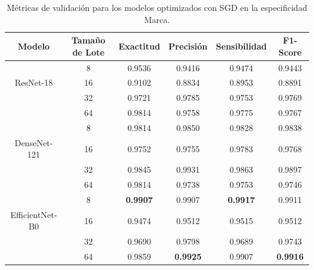 \begin{table}[H]
	\begin{adjustbox}
		{width=1\textwidth}
		\begin{tabular}{|c|c|c|c|c|c|}
			\hline
			\textbf{Modelo}             & \textbf{Tamaño de Lote} & \textbf{Exactitud} & \textbf{Precisión} & \textbf{Sensibilidad} & \textbf{F1-Score} \\
			\hline
			& 8                       & 0.9536             & 0.9416             & 0.9474                & 0.9443            \\
			\cline{2-6} ResNet-18       & 16                      & 0.9102             & 0.8834             & 0.8953                & 0.8891            \\
			\cline{2-6}                 & 32                      & 0.9721             & 0.9785             & 0.9753                & 0.9769            \\
			\cline{2-6}                 & 64                      & 0.9814             & 0.9758             & 0.9775                & 0.9767            \\
			\hline
			& 8                       & 0.9814             & 0.9850             & 0.9828                & 0.9838            \\
			\cline{2-6} DenseNet-121    & 16                      & 0.9752             & 0.9755             & 0.9783                & 0.9768            \\
			\cline{2-6}                 & 32                      & 0.9845             & 0.9931             & 0.9863                & 0.9897            \\
			\cline{2-6}                 & 64                      & 0.9814             & 0.9738             & 0.9753                & 0.9746            \\
			\hline
			& 8                       & \textbf{0.9907}    & 0.9907             & \textbf{0.9917}       & 0.9911            \\
			\cline{2-6} EfficientNet-B0 & 16                      & 0.9474             & 0.9512             & 0.9515                & 0.9512            \\
			\cline{2-6}                 & 32                      & 0.9690             & 0.9798             & 0.9689                & 0.9743            \\
			\cline{2-6}                 & 64                      & 0.9859             & \textbf{0.9925}    & 0.9907                & \textbf{0.9916}   \\
			\hline
		\end{tabular}
	\end{adjustbox}
	\caption{Métricas de validación para los modelos optimizados con SGD en la
		especificidad Marca.}
	\label{tab:sgd_metrics-marca}
\end{table}

